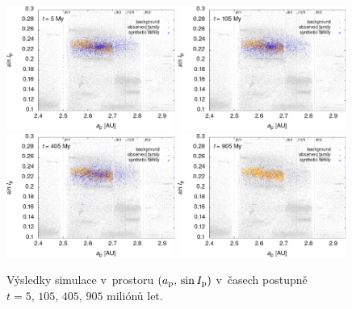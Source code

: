 \documentclass[A4paper, 12pt, oneside, openany]{book}
\begin{document}
\immediate{}
\immediate{}
\immediate{}
\immediate{}
\begin{figure}[t]
	\centering
	\includegraphics[width=0.49\textwidth]{obr/ai_5t.png}
	\includegraphics[width=0.49\textwidth]{obr/ai_105t.png}\\
	\includegraphics[width=0.49\textwidth]{obr/ai_405t.png}
	\includegraphics[width=0.49\textwidth]{obr/ai_905t.png}
	\caption{Výsledky simulace v~prostoru $(a_{\rm p},\,\sin I_{\rm p})$ v~časech postupně $t=5,\,105,\,405,\,905$ miliónů let.} \label{fig:ai_sim}
\end{figure}
\end{document}
